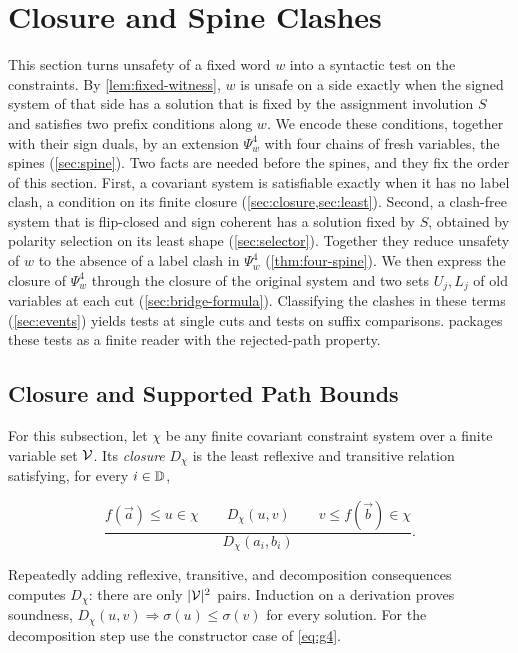 \section{Closure and Spine Clashes}
\label{sec:spines}

This section turns unsafety of a fixed word $w$ into a syntactic test on
the constraints. By \cref{lem:fixed-witness}, $w$ is unsafe on a side
exactly when the signed system of that side has a solution that is fixed by
the assignment involution $S$ and satisfies two prefix conditions along $w$.
We encode these conditions, together with their sign duals, by an extension
$\Psi^4_w$ with four chains of fresh variables, the spines
(\cref{sec:spine}). Two facts are needed before the spines, and they fix
the order of this section. First, a covariant system is satisfiable exactly
when it has no label clash, a condition on its finite closure
(\cref{sec:closure,sec:least}). Second, a clash-free system that is
flip-closed and sign coherent has a solution fixed by $S$, obtained by
polarity selection on its least shape (\cref{sec:selector}). Together they
reduce unsafety of $w$ to the absence of a label clash in $\Psi^4_w$
(\cref{thm:four-spine}). We then express the closure of $\Psi^4_w$ through
the closure of the original system and two sets $U_j,L_j$ of old variables
at each cut (\cref{sec:bridge-formula}). Classifying the clashes in these
terms (\cref{sec:events}) yields tests at single cuts and tests on suffix
comparisons.  packages these tests as a finite reader with
the rejected-path property.

\subsection{Closure and Supported Path Bounds}\label{sec:closure}
For this subsection, let $\chi$ be any finite covariant constraint system over a
finite variable set $\mathcal{V}$. Its \emph{closure} $D_\chi$ is the least reflexive and
transitive relation satisfying, for every $i\in\mathbb{D}$,

\begin{equation}\label{eq:g21}
\frac{f(\vec a)\le u\in\chi\qquad D_\chi(u,v)\qquad
 v\le f(\vec b)\in\chi}{D_\chi(a_i,b_i)}.
\end{equation}

Repeatedly adding reflexive, transitive, and decomposition consequences
computes $D_\chi$: there are only $|\mathcal{V}|^2$ pairs. Induction on a derivation
proves soundness, $D_\chi(u,v)\Rightarrow \sigma(u)\le \sigma(v)$ for every solution.
For the decomposition step use the constructor case of \eqref{eq:g4}.

